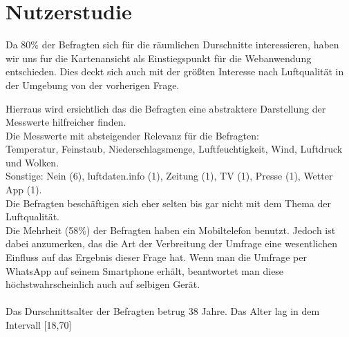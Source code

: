 \section{Nutzerstudie}

\noindent{}
Da 80\% der Befragten sich für die räumlichen Durschnitte interessieren, 
haben wir uns fur die Kartenansicht als Einstiegspunkt für die \gls{Webanwendung} entschieden. 
Dies deckt sich auch mit der größten Interesse nach Luftqualität in der Umgebung von der vorherigen Frage.
\\
\noindent{} 

\noindent{}
Hierraus wird ersichtlich das die Befragten eine abstraktere Darstellung der Messwerte hilfreicher finden.
\\
\noindent{}
Die Messwerte mit absteigender Relevanz für die Befragten: 
\\Temperatur, Feinstaub, Niederschlagsmenge, Luftfeuchtigkeit, Wind, Luftdruck und Wolken.
\\ 
\noindent{}
Sonstige: Nein (6), luftdaten.info (1), Zeitung (1), TV (1), Presse (1), Wetter App (1).
\\
\noindent{}
Die Befragten beschäftigen sich eher selten bis gar nicht mit dem Thema der Luftqualität.
\\
\noindent{}
Die Mehrheit (58\%) der Befragten haben ein Mobiltelefon benutzt. 
Jedoch ist dabei anzumerken, das die Art der Verbreitung der Umfrage eine wesentlichen Einfluss auf das Ergebnis dieser Frage hat. 
Wenn man die Umfrage per WhatsApp auf seinem Smartphone erhält, beantwortet man diese höchstwahrscheinlich auch auf selbigen Gerät.
\\
\\
Das Durschnittsalter der Befragten betrug 38 Jahre. Das Alter lag in dem Intervall [18,70] 